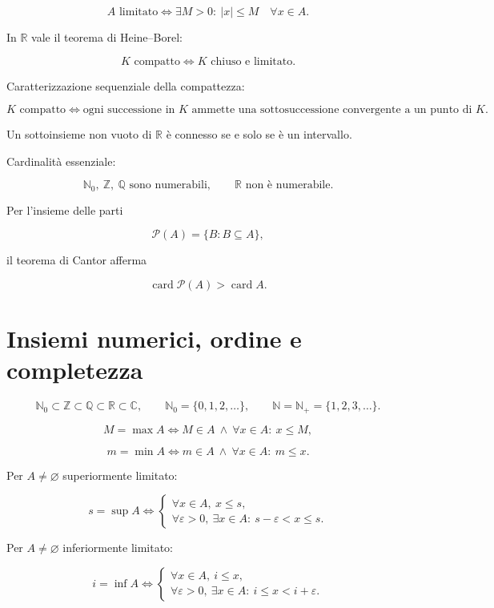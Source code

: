 \[
A\text{ limitato}
\Longleftrightarrow
\exists M>0:\ |x|\le M\quad\forall x\in A.
\]

In \(\mathbb R\) vale il teorema di Heine--Borel:

\[
K\text{ compatto}
\Longleftrightarrow
K\text{ chiuso e limitato}.
\]

Caratterizzazione sequenziale della compattezza:

\[
K\text{ compatto}
\Longleftrightarrow
\text{ogni successione in }K\text{ ammette una sottosuccessione convergente a un punto di }K.
\]

Un sottoinsieme non vuoto di \(\mathbb R\) è connesso se e solo se è un intervallo.

Cardinalità essenziale:

\[
\mathbb N_0,\ \mathbb Z,\ \mathbb Q\text{ sono numerabili},
\qquad
\mathbb R\text{ non è numerabile}.
\]

Per l'insieme delle parti

\[
\mathcal P(A)=\{B:B\subseteq A\},
\]

il teorema di Cantor afferma

\[
\operatorname{card}\mathcal P(A)>\operatorname{card}A.
\]

\section{Insiemi numerici, ordine e completezza}\label{insiemi-numerici-ordine-e-completezza}

\[
\mathbb N_0\subset\mathbb Z\subset\mathbb Q\subset\mathbb R\subset\mathbb C,
\qquad
\mathbb N_0=\{0,1,2,\ldots\},
\qquad
\mathbb N=\mathbb N_+=\{1,2,3,\ldots\}.
\]

\[
M=\max A
\Longleftrightarrow
M\in A\ \land\ \forall x\in A:\ x\le M,
\]

\[
m=\min A
\Longleftrightarrow
m\in A\ \land\ \forall x\in A:\ m\le x.
\]

Per \(A\ne\varnothing\) superiormente limitato:

\[
s=\sup A
\Longleftrightarrow
\begin{cases}
\forall x\in A,\ x\le s,\\
\forall\varepsilon>0,\ \exists x\in A:\ s-\varepsilon<x\le s.
\end{cases}
\]

Per \(A\ne\varnothing\) inferiormente limitato:

\[
i=\inf A
\Longleftrightarrow
\begin{cases}
\forall x\in A,\ i\le x,\\
\forall\varepsilon>0,\ \exists x\in A:\ i\le x<i+\varepsilon.
\end{cases}
\]

